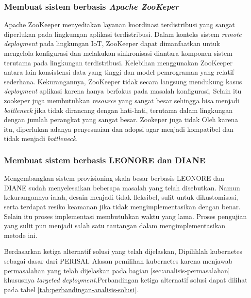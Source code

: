 \subsubsection{Membuat sistem berbasis \textit{Apache ZooKeper}}
Apache ZooKeeper menyediakan layanan koordinasi terdistribusi yang sangat diperlukan pada lingkungan aplikasi terdistribusi. Dalam konteks sistem \textit{remote deployment} pada lingkungan IoT, ZooKeeper dapat dimanfaatkan untuk mengelola konfigurasi dan melakukan sinkronisasi diantara komponen sistem terutama pada lingkungan terdistribusi. Kelebihan menggunakan ZooKeeper antara lain konsistensi data yang tinggi dan model pemrograman yang relatif sederhana. Kekurangannya, ZooKeeper tidak secara langsung mendukung kasus \textit{deployment} aplikasi karena hanya berfokus pada masalah konfigurasi, Selain itu zookeper juga membutuhkan \textit{resource} yang sangat besar sehingga bisa menjadi \textit{bottleneck} jika tidak dirancang dengan hati-hati, terutama dalam lingkungan dengan jumlah perangkat yang sangat besar. Zookeper juga tidak Oleh karena itu, diperlukan adanya penyesuaian dan adopsi agar menjadi kompatibel dan tidak menjadi \textit{bottleneck}.

\subsubsection{Membuat sistem berbasis LEONORE dan DIANE}
Mengembangkan sistem provisioning skala besar berbasis LEONORE dan DIANE sudah menyelesaikan beberapa masalah yang telah disebutkan. Namun kekurangannya ialah, desain menjadi tidak fleksibel, sulit untuk dikustomisasi, serta terdapat resiko keamanan jika tidak mengimplementasikan dengan benar. Selain itu proses implementasi membutuhkan waktu yang lama. Proses pengujian yang sulit pun menjadi salah satu tantangan dalam mengimplementasikan metode ini.

\pagebreak

Berdasarkan ketiga alternatif solusi yang telah dijelaskan, Dipilihlah kubernetes sebagai dasar dari PERISAI. Alasan pemilihan kubernetes karena menjawab permasalahan yang telah dijelaskan pada bagian \ref{sec:analisis-permasalahan} khususnya \textit{targeted deployment}.Perbandingan ketiga alternatif solusi dapat dilihat pada tabel \ref{tab:perbandingan-analisis-solusi}.

